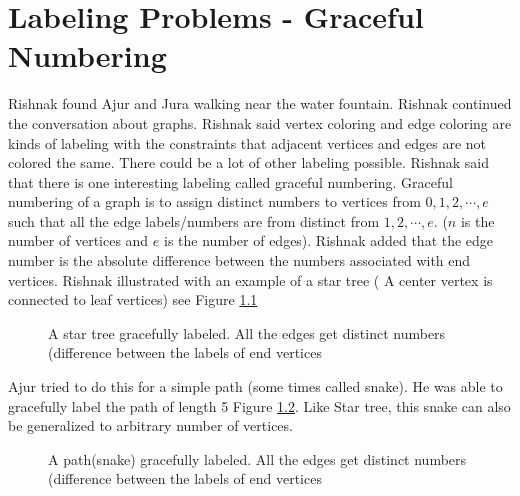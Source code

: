 \chapter{Labeling Problems - Graceful Numbering}

Rishnak found Ajur and Jura walking near the water fountain. Rishnak continued the conversation about graphs. Rishnak said vertex coloring and edge coloring are kinds of labeling with the constraints that adjacent vertices and edges are not colored the same. There could be a lot of other labeling possible. Rishnak said that there is one interesting labeling called graceful numbering. Graceful numbering of a graph is to assign distinct numbers to vertices  from $0, 1,2, \cdots, e$ such that all the edge labels/numbers are from distinct from $1,2, \cdots, e$. ($n$ is the number of vertices and $e$ is the number of edges). Rishnak added that the edge number is the absolute difference between the numbers associated with end vertices.
Rishnak illustrated with an example of a star tree ( A center vertex is connected to leaf vertices) see Figure \ref{19g1}

\begin{figure}
\begin{center}
\caption{A star tree gracefully labeled. All the edges get distinct numbers (difference between the labels of end vertices}\label{19g1}
\end{center}
\end{figure}
Ajur tried to do this for a simple path (some times called snake). He was able to gracefully label the path of length 5 Figure \ref{19g2}. Like Star tree, this snake can also be generalized to arbitrary number of vertices.

\begin{figure}
\begin{center}
\caption{A path(snake) gracefully labeled. All the edges get distinct numbers (difference between the labels of end vertices}\label{19g2}
\end{center}
\end{figure}

